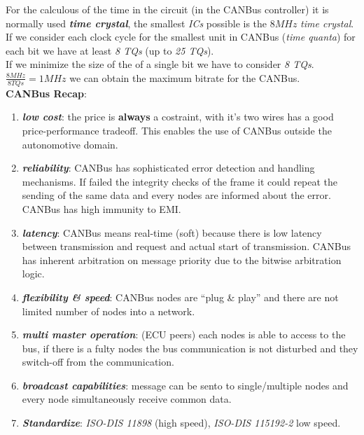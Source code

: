 For the calculous of the time in the circuit (in the CANBus controller) it is normally used \textbf{\textit{time crystal}}, the smallest \textit{ICs} possible is the $8MHz$ \textit{time crystal}. If we consider each clock cycle for the smallest unit in CANBus (\textit{time quanta}) for each bit we have at least \textit{8 TQs} (up to \textit{25 TQs}). \\
If we minimize the size of the of a single bit we have to consider \textit{8 TQs}. $\frac{8MHz}{8 TQs} = 1MHz$ we can obtain the maximum bitrate for the CANBus. \\ \newline
\textbf{CANBus Recap}:
\begin{enumerate}[nosep]
    \item \textbf{\textit{low cost}}: the price is \textbf{always} a costraint, with it's two wires has a good price-performance tradeoff. This enables the use of CANBus outside the autonomotive domain.
    \item \textbf{\textit{reliability}}: CANBus has sophisticated error detection and handling mechanisms. If failed the integrity checks of the frame it could repeat the sending of the same data and every nodes are informed about the error. CANBus has high immunity to EMI.
    \item \textbf{\textit{latency}}: CANBus means real-time (soft) because there is low latency between transmission and request and actual start of transmission. CANBus has inherent arbitration on message priority due to the bitwise arbitration logic.
    \item \textbf{\textit{flexibility \& speed}}: CANBus nodes are ``plug \& play'' and there are not limited number of nodes into a network.
    \item \textbf{\textit{multi master operation}}: (ECU peers) each nodes is able to access to the bus, if there is a fulty nodes the bus communication is not disturbed and they switch-off from the communication.
    \item \textbf{\textit{broadcast capabilities}}: message can be sento to single/multiple nodes and every node simultaneously receive common data. 
    \item \textbf{\textit{Standardize}}: \textit{ISO-DIS 11898} (high speed), \textit{ISO-DIS 115192-2} low speed.
\end{enumerate}

\newpage

